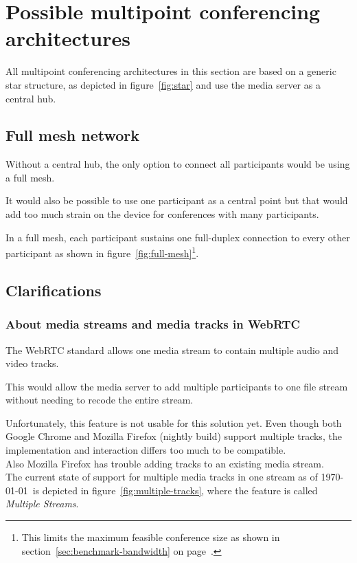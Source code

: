 \documentclass[../../../thesis.tex]{subfiles}
\begin{document}
\section{Possible multipoint conferencing architectures}
\label{sec:multipoint-architectures}
All multipoint conferencing architectures in this section are based on a generic star structure, as depicted in figure~\ref{fig:star} and use the media server as a central hub.

\subsection{Full mesh network}
Without a central hub, the only option to connect all participants would be using a full mesh.\par
It would also be possible to use one participant as a central point but that would add too much strain on the device for conferences with many participants.

In a full mesh, each participant sustains one full-duplex connection to every other participant as shown in figure~\ref{fig:full-mesh}\footnote{This limits the maximum feasible conference size as shown in section~\ref{sec:benchmark-bandwidth} on page~\pageref{sec:benchmark-bandwidth}.}.
\\


\subsection{Clarifications}
\subsubsection{About media streams and media tracks in WebRTC}
The WebRTC standard allows one media stream to contain multiple audio and video tracks.\cite[section 4]{mediacapture-streams}\par
This would allow the media server to add multiple participants to one file stream without needing to recode the entire stream.\par
Unfortunately, this feature is not usable for this solution yet. Even though both Google Chrome and Mozilla Firefox (nightly build) support multiple tracks, the implementation and interaction differs too much to be compatible. \\
Also Mozilla Firefox has trouble adding tracks to an existing media stream.\\
The current state of support for multiple media tracks in one stream as of \today~is depicted in figure~\ref{fig:multiple-tracks}, where the feature is called \emph{Multiple Streams}.
\end{document}
